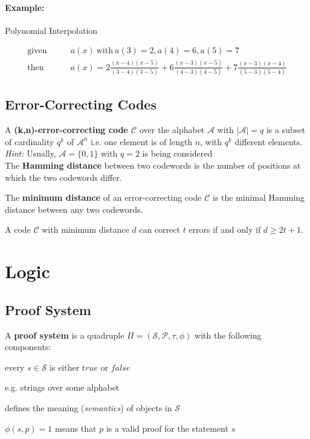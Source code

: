 \documentclass[11pt]{article}
\begin{document}
\paragraph{Example:} Polynomial Interpolation

\begin{equation*}
\begin{split}
	\text{given}\qquad & a(x)\ \text{with}\ a(3) = 2, a(4) = 6, a(5) = 7 \\
	\text{then}\qquad & a(x) = 2\frac{(x-4)(x-5)}{(3-4)(3-5)}+6\frac{(x-3)(x-5)}{(4-3)(4-5)}+7\frac{(x-3)(x-4)}{(5-3)(5-4)} 
\end{split}
\end{equation*}

\subsection{Error-Correcting Codes}

A \textbf{(k,n)-error-correcting code $\mathcal{C}$} over the alphabet $\mathcal{A}$ with $|\mathcal{A}| = q$ is a subset of cardinality $q^k$ of $\mathcal{A}^n$ i.e. one element is of length $n$, with $q^k$ different elements. \\

\emph{Hint:} Usually, $\mathcal{A} = \{0, 1\}$ with $q = 2$ is being considered \\

The \textbf{Hamming distance} between two codewords is the number of positions at which the two codewords differ.

The \textbf{minimum distance} of an error-correcting code $\mathcal{C}$ is the minimal Hamming distance between any two codewords.

A code $\mathcal{C}$ with minimum distance $d$ can correct $t$ errors if and only if $d \geq 2t + 1$.

\section{Logic}

\subsection{Proof System}

A \textbf{proof system} is a quadruple $\Pi = (\mathcal{S}, \mathcal{P}, \tau, \phi)$ with the following components:
\begin{description}[labelindent=16pt,style=multiline,leftmargin=5.5cm, noitemsep]
	\item[set of statements $\mathcal{S}$:] every $s \in \mathcal{S}$ is either $true$ or $false$
	\item[set of proofs $\mathcal{P}$:] e.g. strings over some alphabet
	\item[truth function $\tau$:] defines the meaning (\emph{semantics}) of objects in $\mathcal{S}$
	\item[verification function $\phi$:] $\phi(s, p)=1$ means that $p$ is a valid proof for the statement $s$
\end{description}
\end{document}
